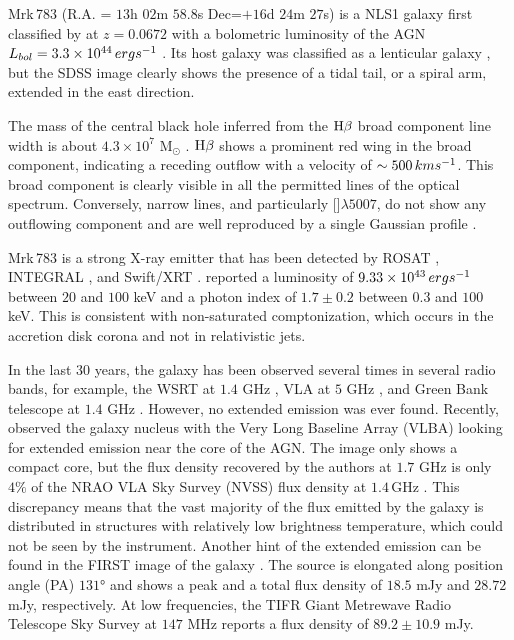\documentclass[../thesis.tex]{subfiles}
\begin{document}
Mrk\,783 (R.A. = $13$h $02$m $58.8$s Dec=$+16$d $24$m $27$s) is a NLS1 galaxy first classified by \citet{Osterbrock85} at $z = 0.0672$ \citep{Hewitt91} with a bolometric luminosity of the AGN $L_{bol} = 3.3\times10^{44}\,erg s^{-1}$ \citep{Berton15a}.
Its host galaxy was classified as a lenticular galaxy \citep{Petrosian07}, but the SDSS image clearly shows the presence of a tidal tail, or a spiral arm, extended in the east direction.

The mass of the central black hole inferred from the $\rm H\beta$ broad component line width is about $4.3\times10^7$ M$_{\odot}$ \citep{Berton15a}.
$\rm H\beta$ shows a prominent red wing in the broad component, indicating a receding outflow with a velocity of $\sim500\,km s^{-1}$. 
This broad component is clearly visible in all the permitted lines of the optical spectrum. 
Conversely, narrow lines, and particularly []$\lambda5007$, do not show any outflowing component and are well reproduced by a single Gaussian profile \citep{Berton16b}.
 
Mrk\,783 is a strong X-ray emitter that has been detected by ROSAT \citep{Schwope00}, INTEGRAL \citep{Krivonos07}, and Swift/XRT \citep{Panessa11}.  
\citet{Panessa11} reported a luminosity of $9.33\times10^{43}\,erg s^{-1}$ between $20$ and $100$ keV and a photon index of $1.7\pm0.2$ between $0.3$ and $100$ keV.
This is consistent with non-saturated comptonization, which occurs in the accretion disk corona and not in relativistic jets.

In the last 30 years, the galaxy has been observed several times in several radio bands, for example, the WSRT at $1.4$ GHz \citep{Meurs81}, VLA at $5$ GHz \citep{Ulvestad84,Ulvestad95}, and Green Bank telescope at $1.4$ GHz \citep{Bicay95}.
However, no extended emission was ever found.
Recently, \citet{Doi13} observed the galaxy nucleus with the Very Long Baseline Array (VLBA) looking for extended emission near the core of the AGN.
The image only shows a compact core, but the flux density recovered by the authors at $1.7$ GHz is only $4\%$ of the NRAO VLA Sky Survey (NVSS) flux density at $1.4\,$GHz \citep[$S_{\nu}=33.2\,$mJy;][]{Condon98}.
This discrepancy means that the vast majority of the flux emitted by the galaxy is distributed in structures with relatively low brightness temperature, which could not be seen by the instrument.
Another hint of the extended emission can be found in the FIRST image of the galaxy \citep{Becker95}.
The source is elongated along position angle (PA) $\ang{131}$ and shows a peak and a total flux density of $18.5$ mJy and $28.72$ mJy, respectively.
At low frequencies, the TIFR Giant Metrewave Radio Telescope Sky Survey \citep[TGSS;][]{Intema17} at $147$ MHz reports a flux density of $89.2\pm10.9$ mJy.
\end{document}
